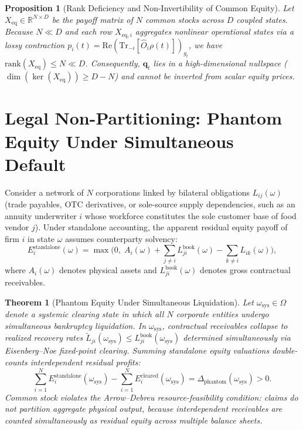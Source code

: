 \documentclass[11pt]{article}
\newtheorem{theorem}{Theorem}
\newtheorem{proposition}{Proposition}
\begin{document}
\begin{proposition}[Rank Deficiency and Non-Invertibility of Common Equity]
Let $X_{\mathrm{eq}} \in \mathbb{R}^{N \times D}$ be the payoff matrix of $N$ common stocks across $D$ coupled states. Because $N \ll D$ and each row $X_{\mathrm{eq}, i}$ aggregates nonlinear operational states via a lossy contraction $p_i(t) = \mathrm{Re}(\mathrm{Tr}_{-i}[\hat{O}_i \rho(t)])_{g_t}$, we have $\mathrm{rank}(X_{\mathrm{eq}}) \le N \ll D$. Consequently, $\bm{q}_t$ lies in a high-dimensional nullspace ($\dim(\ker(X_{\mathrm{eq}})) \ge D - N$) and cannot be inverted from scalar equity prices.
\end{proposition}

\section{Legal Non-Partitioning: Phantom Equity Under Simultaneous Default}

Consider a network of $N$ corporations linked by bilateral obligations $L_{ij}(\omega)$ (trade payables, OTC derivatives, or sole-source supply dependencies, such as an annuity underwriter $i$ whose workforce constitutes the sole customer base of food vendor $j$). Under standalone accounting, the apparent residual equity payoff of firm $i$ in state $\omega$ assumes counterparty solvency:
\begin{equation}
    E_i^{\mathrm{standalone}}(\omega) = \max\Bigg(0, \; A_i(\omega) + \sum_{j \neq i} L_{ji}^{\mathrm{book}}(\omega) - \sum_{k \neq i} L_{ik}(\omega)\Bigg),
\end{equation}
where $A_i(\omega)$ denotes physical assets and $L_{ji}^{\mathrm{book}}(\omega)$ denotes gross contractual receivables.

\begin{theorem}[Phantom Equity Under Simultaneous Liquidation]
Let $\omega_{\mathrm{sys}} \in \Omega$ denote a systemic clearing state in which all $N$ corporate entities undergo simultaneous bankruptcy liquidation. In $\omega_{\mathrm{sys}}$, contractual receivables collapse to realized recovery rates $\tilde{L}_{ji}(\omega_{\mathrm{sys}}) \le L_{ji}^{\mathrm{book}}(\omega_{\mathrm{sys}})$ determined simultaneously via Eisenberg--Noe fixed-point clearing. Summing standalone equity valuations double-counts interdependent residual profits:
\begin{equation}
    \sum_{i=1}^N E_i^{\mathrm{standalone}}(\omega_{\mathrm{sys}}) - \sum_{i=1}^N E_i^{\mathrm{cleared}}(\omega_{\mathrm{sys}}) = \Delta_{\mathrm{phantom}}(\omega_{\mathrm{sys}}) > 0.
\end{equation}
Common stock violates the Arrow--Debreu resource-feasibility condition: claims do not partition aggregate physical output, because interdependent receivables are counted simultaneously as residual equity across multiple balance sheets.
\end{theorem}
\end{document}
